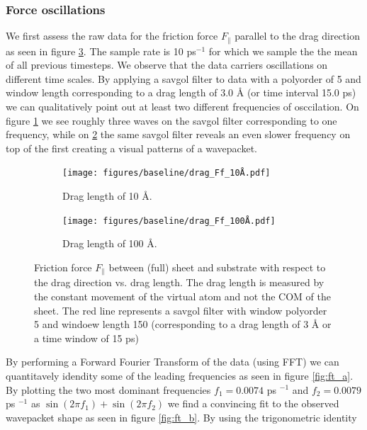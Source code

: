 \subsubsection{Force oscillations}
We first assess the raw data for the friction force $F_{\parallel}$ parallel to the drag direction as seen in figure \ref{fig:drag_Ff}. The sample rate is 10 ps$^{-1}$ for which we sample the the mean of all previous timesteps. We observe that the data carriers oscillations on different time scales. By applying a savgol filter to data with a polyorder of 5 and window length corresponding to a drag length of 3.0 Å (or time interval 15.0 ps) we can qualitatively point out at least two different frequencies of osccilation. On figure \ref{fig:drag_Ff_10} we see roughly three waves on the savgol filter corresponding to one frequency, while on \ref{fig:drag_Ff_100} the same savgol filter reveals an even slower frequency on top of the first creating a visual patterns of a wavepacket.

\begin{figure}[H]
  \centering
  \begin{subfigure}[b]{0.49\textwidth}
      \centering
      \texttt{[image: figures/baseline/drag\_Ff\_10Å.pdf]}
      \caption{Drag length of 10 Å.}
      \label{fig:drag_Ff_10}
  \end{subfigure}
  \hfill
  \begin{subfigure}[b]{0.49\textwidth}
      \centering
      \texttt{[image: figures/baseline/drag\_Ff\_100Å.pdf]}
      \caption{Drag length of 100 Å.}
      \label{fig:drag_Ff_100}
  \end{subfigure}
  \hfill
     \caption{Friction force $F_\parallel$ between (full) sheet and substrate with respect to the drag direction vs. drag length. The drag length is measured by the constant movement of the virtual atom and not the COM of the sheet. The red line represents a savgol filter with window polyorder 5 and windoew length 150 (corresponding to a drag length of 3 Å or a time window of 15 ps)}
     \label{fig:drag_Ff}
\end{figure}

By performing a Forward Fourier Transform of the data (using FFT) we can quantitavely idendity some of the leading frequencies as seen in figure \ref{fig:ft_a}. By plotting the two most dominant frequencies $f_1 = 0.0074$ ps $^{-1}$ and $f_2 = 0.0079$ ps $^{-1}$ as $\sin{(2\pi f_1)} + \sin{(2\pi f_2)}$ we find a convincing fit to the observed wavepacket shape as seen in figure \ref{fig:ft_b}. By using the trigonometric identity


